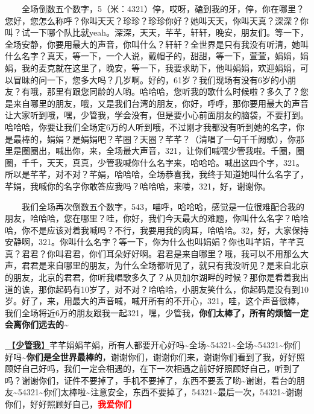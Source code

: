 \documentclass[]{ctexbook}
\begin{document}
  全场倒数五个数字，5（米：4321）停，哎呀，磕到我的牙，停，你在哪里？您好，您怎么称呼？你叫天天？珍珍？珍珍你好？她叫天天，你叫天真？深深？你叫？试一下哪个队比就yeah。深深，天天，芊芊，轩轩，晚安，朋友们。等一下，全场安静，你要用最大的声音，你叫什么？轩轩？全世界是只有我没有听清，她叫什么名字？真天，等一下，一个人说，戴帽子的，甜甜，等一下，萱萱，娟娟，娟娟，我的麦克就在这里了，晚安，等一下，我要求助下，他叫娟娟，欢迎娟娟，可以冒昧的问一下，您多大吗？几岁啊。好的，61岁？我们现场有没有6岁的小朋友？有哦，那里有跟您同龄的人哟。哈哈哈，您听我的歌什么时候啦？多久了？您是来自哪里的朋友，哦，又是我们台湾的朋友，你好，呼呼，那你要用最大的声音让大家听到哦，嘿，少管我，学会没有，但是要小心前面朋友的脑袋，不要打到。哈哈哈，你要让我们全场定6万的人听到哦，不过刚才我都没有听到她的名字，你是最棒的，娟娟？是娟娟吧？芊圈？天圈？芊芊？（清唱了一句千千阙歌），你那里是圈圈出，喊出你，来，全场最大声音，321，让你们喊嘿少管我啦。千圈，圈圈，千千，天天，真真，少管我喊你什么名字来，哈哈哈。喊出这四个字，321。所以是芊芊，对不对？芊娟，哈哈哈，全场恭喜我，我终于知道她叫什么名字了，芊娟，我喊你的名字你敢答应我吗？哈哈哈，来喽，321，好，谢谢你。

  我们全场再次倒数五个数字，543，喵呼，哈哈哈，感觉是一位很难配合我的朋友，哈哈哈，您在哪里？哇，你好，我们今天最大的难题，你叫什么名字？哈哈哈，你不是应该对着我喊吗？不行，我要用我的肉耳，哈哈哈。32，好，大家保持安静啊，321。你叫什么名字？等一下，你为什么也叫娟娟？你也叫芊娟，芊芊真真？君君？你叫君君，你们耳朵好好啊。君君是来自哪里？哦，我可以不用那么大声，君君是来自哪里的朋友，为什么全场都听见了，就只有我没听见？是来自北京的朋友，北京的君君，你听我唱歌多久了？从贝加尔湖畔的时候？那你是看着我出道的诶，那你起码有10岁了，对不对？哈哈哈，小朋友笑什么，你起码是没有到10岁。好了，来，用最大的声音喊，喊开所有的不开心，321，哇，这个声音很棒，我们全场将近6万的朋友跟我一起321，嘿，少管我，\textbf{你们太棒了，所有的烦恼一定会离你们远去的\textasciitilde{}}

\hyperref[watch-ur-manners]{🎵【\textbf{少管我}】}芊芊娟娟芊娟，所有人都要开心好吗\textasciitilde 全场\textasciitilde54321\textasciitilde 全场\textasciitilde54321\textasciitilde 你们好吗\textasciitilde{}\textbf{你们是全世界最棒的}，谢谢你们，谢谢你们来，谢谢你们看到了我，好好照顾好自己好吗，我们一定会相遇的，在下一次相遇之前好好照顾好自己，听到了吗？谢谢你们，证件不要掉了，手机不要掉了，东西不要丢了哟\textasciitilde 谢谢，看台的朋友\textasciitilde54321\textasciitilde 你们太棒啦\textasciitilde 注意安全，东西不要掉了，54321\textasciitilde 最后一次，54321\textasciitilde 谢谢你们，好好照顾好自己，\textbf{\textcolor{red}{我爱你们~} }
\end{document}
